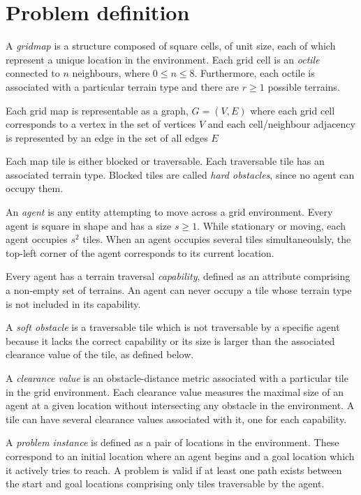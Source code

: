 \section{Problem definition}
A \emph{gridmap} is a structure composed of square cells, of unit size, each of which represent a unique location in the environment. 
Each grid cell is an \emph{octile} connected to $n$ neighbours, where  $0 \leq n \leq 8$. 
Furthermore, each octile is associated with a particular terrain type and there are $r \geq 1$ possible terrains.
\par \indent
Each grid map is representable as a graph, $G = (V, E)$ where each grid cell corresponds to a vertex in the set of vertices $V$ and each cell/neighbour adjacency is represented by an edge in the set of all edges $E$
\par \indent
Each map tile is either blocked or traversable. 
Each traversable tile has an associated terrain type. 
Blocked tiles are called \emph{hard obstacles}, since no agent can occupy them.
\par \indent
An \emph{agent} is any entity attempting to move across a grid environment. 
Every agent is square in shape and has a size $s \geq 1$.
While stationary or moving, each agent occupies $s^2$ tiles. 
When an agent occupies several tiles simultaneoulsly, the top-left corner of the agent corresponds to its current location.
\par \indent
Every agent has a terrain traversal \emph{capability}, defined as an attribute comprising a non-empty set of terrains. 
An agent can never occupy a tile whose terrain type is not included in its capability.
\par \indent 
A \emph{soft obstacle} is a traversable tile which is not traversable by a specific agent because it lacks the correct capability or its size is larger than the associated clearance value of the tile, as defined below. 
\par \indent
A \emph{clearance value} is an obstacle-distance metric associated with a particular tile in the grid environment. 
Each clearance value measures the maximal size of an agent at a given location without intersecting any obstacle in the environment. 
A tile can have several clearance values associated with it, one for each capability. 
\par \indent
A \emph{problem instance} is defined as a pair of locations in the environment. These correspond to an initial location where an agent begins and a goal location which it actively tries to reach. A problem is valid if at least one path exists between the start and goal locations comprising only tiles traversable by the agent. 
